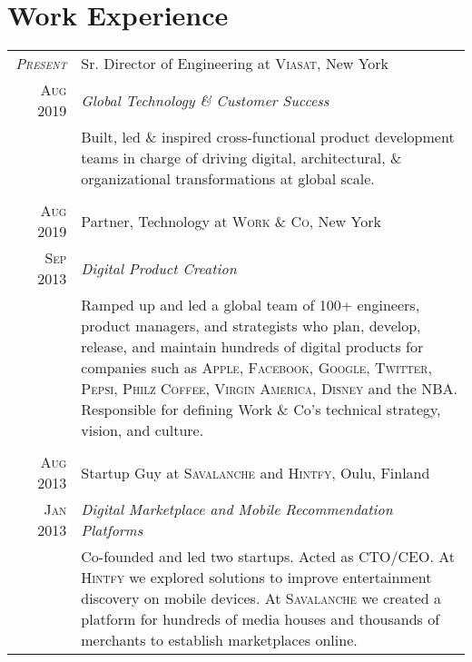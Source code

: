 \documentclass[a4paper,10pt]{article}
\begin{document}
\section{Work Experience}
\begin{tabular}{r|p{11cm}}
  \textsc{\emph{Present}} & Sr. Director of Engineering at \textsc{Viasat}, New York \\

  \textsc{Aug 2019} & \emph{Global Technology \& Customer Success}\\

  &\footnotesize{Built, led \& inspired cross-functional product
    development teams in charge of driving digital, architectural, \&
    organizational transformations at global scale.}\\

  \multicolumn{2}{c}{}\\

  \textsc{Aug 2019} & Partner, Technology at \textsc{Work \& Co}, New York \\

  \textsc{Sep 2013} & \emph{Digital Product Creation}\\

  &\footnotesize{Ramped up and led a global team of 100+ engineers, product
    managers, and strategists who plan, develop, release, and maintain hundreds
    of digital products for companies such as \textsc{Apple}, \textsc{Facebook},
    \textsc{Google}, \textsc{Twitter}, \textsc{Pepsi}, \textsc{Philz Coffee},
    \textsc{Virgin America}, \textsc{Disney} and the \textsc{NBA}. Responsible
    for defining Work \& Co's technical strategy, vision, and culture.}\\

  \multicolumn{2}{c}{}\\

  \textsc{Aug 2013} & Startup Guy at \textsc{Savalanche} and \textsc{Hintfy}, Oulu, Finland \\

  \textsc{Jan 2013} & \emph{Digital Marketplace and Mobile Recommendation Platforms} \\

  &\footnotesize{Co-founded and led two startups. Acted as \textsc{CTO/CEO}. At
    \textsc{Hintfy} we explored solutions to improve entertainment discovery on
    mobile devices. At \textsc{Savalanche} we created a platform for hundreds of
    media houses and thousands of merchants to establish marketplaces online.}\\


\end{tabular}
\end{document}
